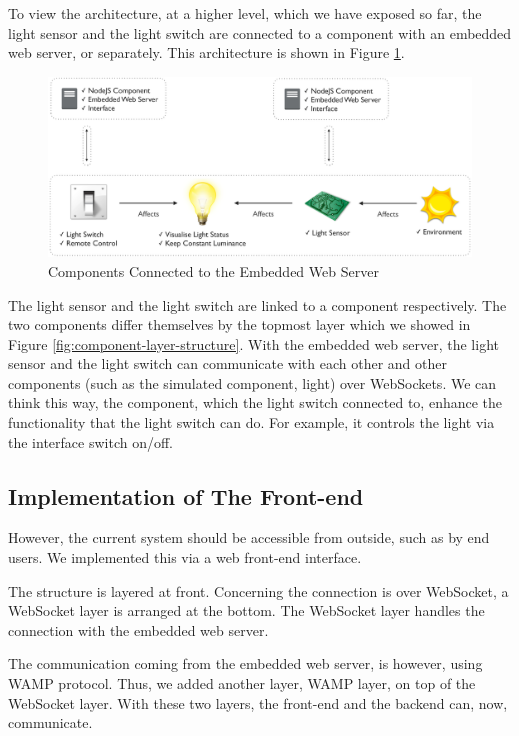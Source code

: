 To view the architecture, at a higher level, which we have exposed so far, the light sensor and the light switch are connected to a component with an embedded web server, or separately. This architecture is shown in Figure \ref{fig:component-nodeJS-interface}.

\begin{figure}[ht]
  \begin{center}
    \includegraphics[width=1\textwidth]{images/component-nodeJS-interface.pdf}
    \caption{Components Connected to the Embedded Web Server}
    \label{fig:component-nodeJS-interface}
  \end{center}
\end{figure}

The light sensor and the light switch are linked to a component respectively. The two components differ themselves by the topmost layer which we showed in Figure \ref{fig:component-layer-structure}. With the embedded web server, the light sensor and the light switch can communicate with each other and other components (such as the simulated component, light) over WebSockets. We can think this way, the component, which the light switch connected to, enhance the functionality that the light switch can do. For example, it controls the light via the interface switch on/off. 

\subsection{Implementation of The Front-end}
However, the current system should be accessible from outside, such as by end users. We implemented this via a web front-end interface. 

The structure is layered at front. Concerning the connection is over WebSocket, a WebSocket layer is arranged at the bottom. The WebSocket layer handles the connection with the embedded web server. 

The communication coming from the embedded web server, is however, using WAMP protocol. Thus, we added another layer, WAMP layer, on top of the WebSocket layer. With these two layers, the front-end and the backend can, now, communicate.

